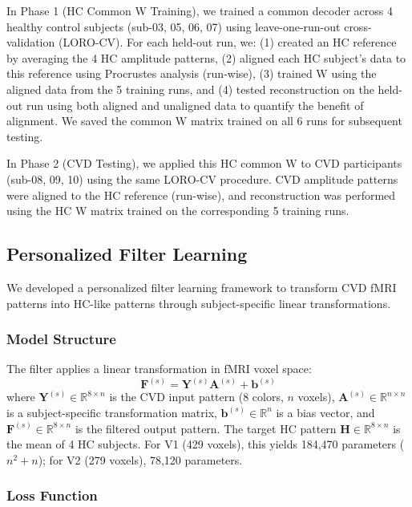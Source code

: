 \documentclass[12pt,a4paper]{article}
\begin{document}
In Phase 1 (HC Common W Training), we trained a common decoder across 4 healthy control subjects (sub-03, 05, 06, 07) using leave-one-run-out cross-validation (LORO-CV). For each held-out run, we: (1) created an HC reference by averaging the 4 HC amplitude patterns, (2) aligned each HC subject's data to this reference using Procrustes analysis (run-wise), (3) trained W using the aligned data from the 5 training runs, and (4) tested reconstruction on the held-out run using both aligned and unaligned data to quantify the benefit of alignment. We saved the common W matrix trained on all 6 runs for subsequent testing.

In Phase 2 (CVD Testing), we applied this HC common W to CVD participants (sub-08, 09, 10) using the same LORO-CV procedure. CVD amplitude patterns were aligned to the HC reference (run-wise), and reconstruction was performed using the HC W matrix trained on the corresponding 5 training runs.

\subsection{Personalized Filter Learning}

We developed a personalized filter learning framework to transform CVD fMRI patterns into HC-like patterns through subject-specific linear transformations.

\subsubsection{Model Structure}

The filter applies a linear transformation in fMRI voxel space:
\begin{equation}
\mathbf{F}^{(s)} = \mathbf{Y}^{(s)} \mathbf{A}^{(s)} + \mathbf{b}^{(s)}
\label{eq:filter}
\end{equation}
where $\mathbf{Y}^{(s)} \in \mathbb{R}^{8 \times n}$ is the CVD input pattern (8 colors, $n$ voxels), $\mathbf{A}^{(s)} \in \mathbb{R}^{n \times n}$ is a subject-specific transformation matrix, $\mathbf{b}^{(s)} \in \mathbb{R}^n$ is a bias vector, and $\mathbf{F}^{(s)} \in \mathbb{R}^{8 \times n}$ is the filtered output pattern. The target HC pattern $\mathbf{H} \in \mathbb{R}^{8 \times n}$ is the mean of 4 HC subjects. For V1 (429 voxels), this yields 184,470 parameters ($n^2 + n$); for V2 (279 voxels), 78,120 parameters.

\subsubsection{Loss Function}
\end{document}
